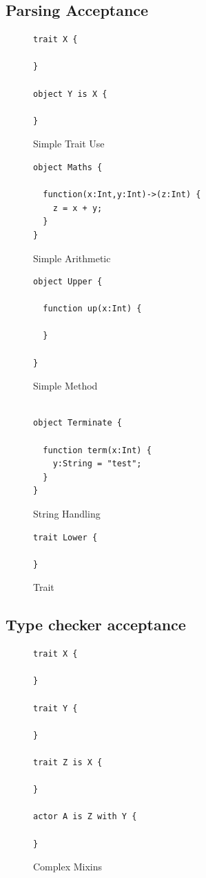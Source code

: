 \documentclass[11pt,a4paper]{report}
\begin{document}
\subsection{Parsing Acceptance}
\begin{figure}[H]
\begin{verbatim}
trait X {

}

object Y is X {

}
\end{verbatim}
\caption{Simple Trait Use}
\end{figure}

\begin{figure}[H]
\begin{verbatim}
object Maths {

  function(x:Int,y:Int)->(z:Int) {
    z = x + y;
  }
}
\end{verbatim}
\caption{Simple Arithmetic}
\end{figure}

\begin{figure}[H]
\begin{verbatim}
object Upper {

  function up(x:Int) {

  }

}
\end{verbatim}
\caption{Simple Method}
\end{figure}

\begin{figure}[H]
\begin{verbatim}

object Terminate {

  function term(x:Int) {
    y:String = "test";
  }
}
\end{verbatim}
\caption{String Handling}
\end{figure}

\begin{figure}[H]
\begin{verbatim}
trait Lower {

}
\end{verbatim}
\caption{Trait}
\end{figure}

\subsection{Type checker acceptance}

\begin{figure}[H]
\begin{verbatim}
trait X {

}

trait Y {

}

trait Z is X {

}

actor A is Z with Y {

}
\end{verbatim}
\caption{Complex Mixins}
\end{figure}
\end{document}
